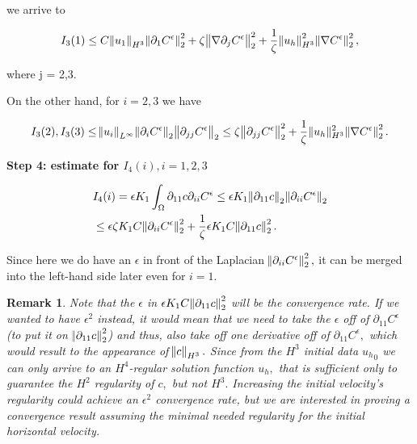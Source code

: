 \documentclass[11pt]{article}
\newtheorem{remark}{Remark}
\begin{document}
we arrive to

\begin{equation}
    I_3(1) \leq C \norm{u_1}_{H^3} \norm{\partial_1 C^\epsilon}_2^2 + \zeta \norm{\nabla \partial_j C^\epsilon}_2^2 + \frac{1}{\zeta} \norm{u_h}_{H^3}^2 \norm{\nabla C^\epsilon}_2^2,
\end{equation}

where j = 2,3.

On the other hand, for $i = 2,3$ we have

\begin{equation}
  I_3(2), I_3(3) \leq \norm{u_i}_{L^\infty} \norm{\partial_i C^\epsilon}_2 \norm{\partial_{jj}C^\epsilon}_2 \leq \zeta \norm{\partial_{jj} C^\epsilon}_2^2 + \frac{1}{\zeta} \| u_h \| _ {H^3} ^ 2 \norm{\nabla C^\epsilon}_2^2.
\end{equation}

\textbf{Step 4: estimate for $I_4(i), i = 1,2,3$}

\begin{equation}
  \begin{split}
    & I_4(i) = \epsilon K_1 \int_\Omega \partial_{11} c \partial_{ii} C^\epsilon \leq \epsilon K_1 \norm{\partial_{11} c}_2 \norm{\partial_{ii} C^\epsilon}_2 \\
    & \leq \epsilon \zeta K_1 C \norm{\partial_{ii} C^\epsilon}_2^2 + \frac{1}{\zeta}\epsilon K_1 C \norm{\partial_{11} c}_2^2.
  \end{split}
\end{equation}

Since here we do have an $\epsilon$ in front of the Laplacian $ \norm{\partial_{ii} C^\epsilon}_2^2,$ it can be merged into the left-hand side later even for $i = 1.$

\begin{remark}
Note that the $\epsilon$ in $\epsilon K_1 C \norm{\partial_{11} c}_2^2$ will be the convergence rate. If we wanted to have $\epsilon^2$ instead, it would mean that we need to take the $\epsilon$ off of $\partial_{11} C^\epsilon$ (to put it on $\norm{\partial_{11} c}_2^2$) and thus, also take off one derivative off of $\partial_{11} C^\epsilon,$ which would result to the appearance of $\norm{c}_{H^3}.$ Since from the $H^3$ initial data ${u_h}_0$ we can only arrive to an $H^4$-regular solution function $u_h,$ that is sufficient only to guarantee the $H^2$ regularity of $c,$ but not $H^3.$ Increasing the initial velocity's regularity could achieve an $\epsilon^2$ convergence rate, but we are interested in proving a convergence result assuming the minimal needed regularity for the initial horizontal velocity.
\end{remark}
\end{document}
